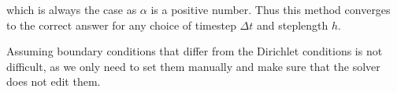 \documentclass[reprint,english,notitlepage]{revtex4-1}  %
\newcommand\numberthis{\addtocounter{equation}{1}\tag{\theequation}}
\begin{document}
which is always the case as $\alpha$ is a positive number. Thus this method converges to the correct answer for any choice of timestep $\Delta t$ and steplength $h$.

Assuming boundary conditions that differ from the Dirichlet conditions is not difficult, as we only need to set them manually and make sure that the solver does not edit them. 







\end{document}
